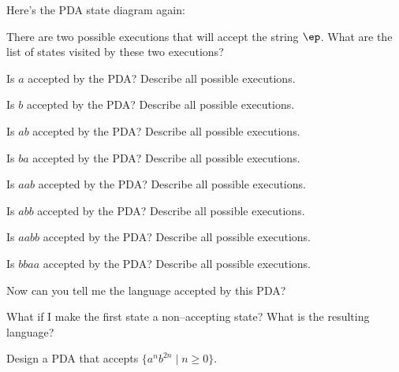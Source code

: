 \newpage
\begin{ex}
Here's the PDA state diagram again:

\begin{center}
\end{center}

\begin{tightlist}
\item There are two possible executions that will accept the string $\ep$.
What are the list of states visited by these two executions?
\item Is $a$ accepted by the PDA? Describe all possible executions.
\item Is $b$ accepted by the PDA? Describe all possible executions.
\item Is $ab$ accepted by the PDA? Describe all possible executions.
\item Is $ba$ accepted by the PDA? Describe all possible executions.
\item Is $aab$ accepted by the PDA? Describe all possible executions.
\item Is $abb$ accepted by the PDA? Describe all possible executions.
\item Is $aabb$ accepted by the PDA? Describe all possible executions.
\item Is $bbaa$ accepted by the PDA? Describe all possible executions.
\item Now can you tell me the language accepted by this PDA?
\item What if I make the first state a non--accepting state? What is the 
resulting language?
\end{tightlist}
\end{ex}



\newpage
\begin{ex}
Design a PDA that accepts $\{a^n b^{2n} \mid n \geq 0\}$.
\end{ex}



